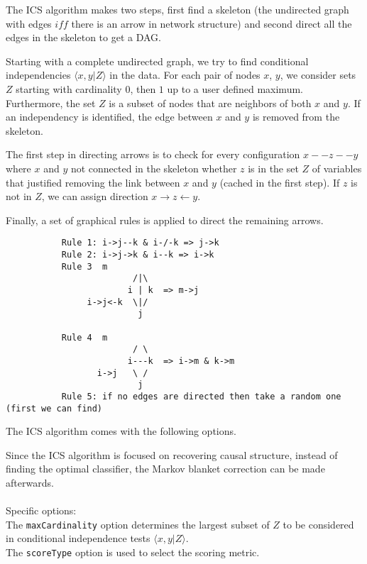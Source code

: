 \documentclass[a4paper]{article}
\begin{document}
The ICS algorithm makes two steps, first find a skeleton (the undirected graph with edges $iff$ there
is an arrow in network structure) and second direct all the edges in the skeleton
to get a DAG.

Starting with a complete undirected graph, we try to find conditional independencies
$\langle x,y|Z\rangle$ in the data. For each pair of nodes $x$, $y$, we consider sets
$Z$ starting with cardinality $0$, then $1$ up to a user defined maximum. Furthermore,
the set $Z$ is a subset of nodes that are neighbors of both $x$ and $y$. If an
independency is identified, the edge between $x$ and $y$ is removed from the skeleton.

The first step in directing arrows is to check for every configuration $x--z--y$
where $x$ and $y$ not connected in the skeleton whether $z$ is in the set $Z$ of
variables that justified removing the link between $x$ and $y$ (cached in the
first step). If $z$ is not in $Z$, we can assign direction $x\to z\leftarrow y$.

Finally, a set of graphical rules is applied \cite{verma} to direct the remaining
arrows.
\begin{verbatim}
           Rule 1: i->j--k & i-/-k => j->k
           Rule 2: i->j->k & i--k => i->k
           Rule 3  m
                         /|\
                        i | k  => m->j
                i->j<-k  \|/
                          j
        
           Rule 4  m
                         / \
                        i---k  => i->m & k->m
                  i->j   \ /
                          j
           Rule 5: if no edges are directed then take a random one (first we can find)
\end{verbatim}

The ICS algorithm comes with the following options.

\begin{center}
\end{center}

Since the ICS algorithm is focused on recovering causal structure, instead of 
finding the optimal classifier, the Markov blanket correction can be made 
afterwards.\\
\\
Specific options:\\
The {\tt maxCardinality} option determines the largest subset of $Z$ to be 
considered in conditional independence tests $\langle x,y|Z\rangle$. \\
The {\tt scoreType} option is used to select the scoring metric.
\end{document}
